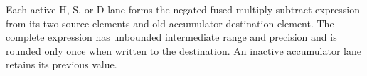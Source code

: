 Each active H, S, or D lane forms the negated fused multiply-subtract
expression from its two source elements and old accumulator destination
element. The complete expression has unbounded intermediate range and
precision and is rounded only once when written to the destination. An
inactive accumulator lane retains its previous value.
